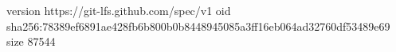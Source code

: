 version https://git-lfs.github.com/spec/v1
oid sha256:78389ef6891ae428fb6b800b0b8448945085a3ff16eb064ad32760df53489e69
size 87544
